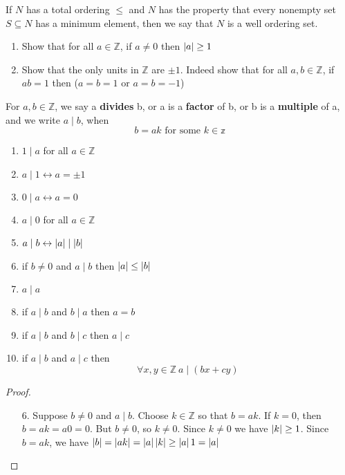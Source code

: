 \begin{rem}
If $N$ has a total ordering $\leq$ and $N$ has the property that every nonempty set $S\subseteq N$ has a minimum element, then we say that $N$ is a well ordering set.
\end{rem}

\begin{exer}
\begin{enumerate}
    \item Show that for all $a\in \mathbb{Z}$, if $a\neq 0$ then $\left| a \right| \geq 1$
    \item Show that the only units in $\mathbb{Z}$ are $\pm 1$. Indeed show that for all $a,b\in\mathbb{Z}$, if $ab=1$ then ($a=b=1$ or $a=b=-1$)
\end{enumerate}
\end{exer}





\begin{defn}
For $a,b\in\mathbb{Z}$, we say a \textbf{divides} b, or a is a \textbf{factor} of b, or b is a \textbf{multiple} of a, and we write $a\mid b$, when \[b=ak \text{ for some } k\in \mathbb{z}\]
\end{defn}

\begin{thm}
\leavevmode
\begin{enumerate}
    \item $1\mid a$ for all $a\in\mathbb{Z}$
    \item $a\mid 1 \leftrightarrow a=\pm 1$
    \item $0\mid a \leftrightarrow a=0$
    \item $a\mid 0$ for all $a\in\mathbb{Z}$
    \item $a\mid b \leftrightarrow \left| a \right| \mid \left| b \right|$
    \item if $b\neq 0$ and $a\mid b$ then $\left| a \right| \leq \left| b \right|$
    \item $a\mid a$
    \item if $a\mid b$ and $b\mid a$ then $a=b$
    \item if $a\mid b$ and $b\mid c$ then $a\mid c$
    \item if $a\mid b$ and $a\mid c$ then \[\forall x,y\in \mathbb{Z} \ a\mid (bx+cy)\]
\end{enumerate}
\end{thm}

\begin{proof}
\leavevmode
\begin{enumerate}
    \item[6.] Suppose $b\neq 0$ and $a\mid b$. Choose $k\in\mathbb{Z}$ so that $b=ak$. If $k=0$, then $b=ak=a0=0$. But $b\neq 0$, so $k\neq 0$. Since $k\neq 0$ we have $\left| k \right|\geq 1$. Since $b=ak$, we have $\left| b \right| = \left| ak \right| = \left| a \right| \left| k \right| \geq \left| a \right|1 = \left| a \right|$
\end{enumerate}
\end{proof}